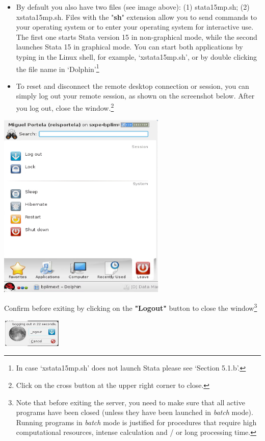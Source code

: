 \documentclass[]{book}
\let\rmarkdownfootnote\footnote%
\def\footnote{\protect\rmarkdownfootnote}
\begin{document}
\begin{itemize}
\item
  By default you also have two files (see image above): (1)
  stata15mp.sh; (2) xstata15mp.sh. Files with the
  "\textbf{{sh}}" extension allow you to send commands to
  your operating system or to enter your operating system for
  interactive use. The first one starts Stata version 15 in
  non-graphical mode, while the second launches Stata 15 in
  graphical mode. You can start both applications by typing in the
  Linux shell, for example, `xstata15mp.sh', or by double clicking
  the file name in `Dolphin'\footnote{In case `xstata15mp.sh' does not launch Stata please see `Section
    5.1.b'.}
\item
  To reset and disconnect the remote desktop connection or session,
  you can simply log out your remote session, as shown on the
  screenshot below. After you log out, close the window.\footnote{Click on the cross button at the upper right corner to close.}
\end{itemize}

\includegraphics[width=3.14961in,height=3.50521in]{./media/image7.png}

Confirm before exiting by clicking on the \textbf{"Logout"} button to close the window\footnote{Note that before exiting the server, you need to make
  sure that all active programs have been closed (unless they have
  been launched in \emph{batch} mode). Running programs in \emph{batch} mode is justified for
  procedures that require high computational resources, intense
  calculation and / or long processing time.}

\includegraphics[width=1.14236in,height=0.52288in]{./media/image8.png}
\end{document}
